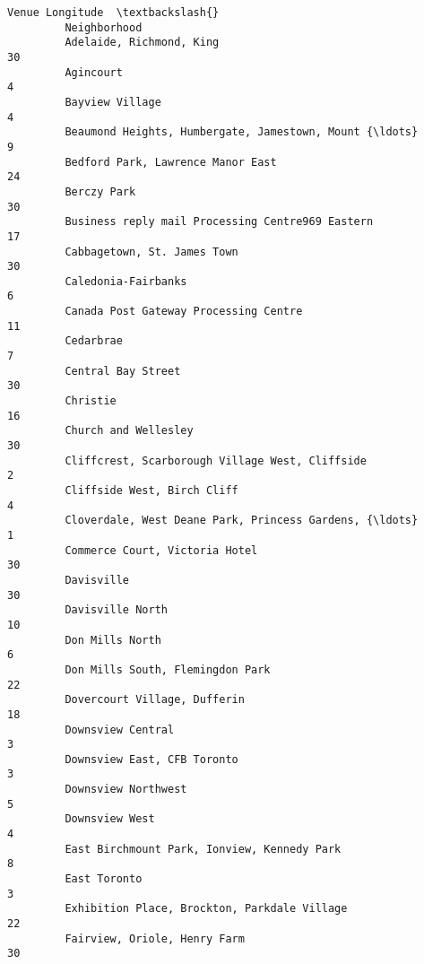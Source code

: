 \documentclass[11pt]{article}
\begin{document}
\begin{Verbatim}[commandchars=\\\{\}]
                                                             Venue Longitude  \textbackslash{}
         Neighborhood                                                          
         Adelaide, Richmond, King                                         30   
         Agincourt                                                         4   
         Bayview Village                                                   4   
         Beaumond Heights, Humbergate, Jamestown, Mount {\ldots}                9   
         Bedford Park, Lawrence Manor East                                24   
         Berczy Park                                                      30   
         Business reply mail Processing Centre969 Eastern                 17   
         Cabbagetown, St. James Town                                      30   
         Caledonia-Fairbanks                                               6   
         Canada Post Gateway Processing Centre                            11   
         Cedarbrae                                                         7   
         Central Bay Street                                               30   
         Christie                                                         16   
         Church and Wellesley                                             30   
         Cliffcrest, Scarborough Village West, Cliffside                   2   
         Cliffside West, Birch Cliff                                       4   
         Cloverdale, West Deane Park, Princess Gardens, {\ldots}                1   
         Commerce Court, Victoria Hotel                                   30   
         Davisville                                                       30   
         Davisville North                                                 10   
         Don Mills North                                                   6   
         Don Mills South, Flemingdon Park                                 22   
         Dovercourt Village, Dufferin                                     18   
         Downsview Central                                                 3   
         Downsview East, CFB Toronto                                       3   
         Downsview Northwest                                               5   
         Downsview West                                                    4   
         East Birchmount Park, Ionview, Kennedy Park                       8   
         East Toronto                                                      3   
         Exhibition Place, Brockton, Parkdale Village                     22   
         Fairview, Oriole, Henry Farm                                     30   

\end{Verbatim}
\end{document}
